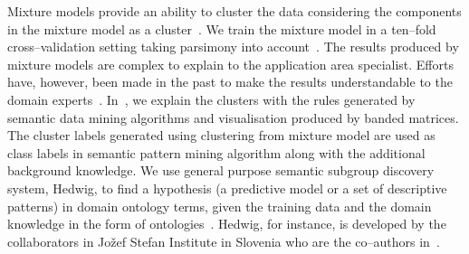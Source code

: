 Mixture models provide an ability to cluster the data
considering the components in the mixture model as 
a cluster~\cite{mclachlan1988mixture,melnykov2010finite}.
We train the mixture model in a ten--fold cross--validation 
setting taking parsimony into account~\cite{tikka2007b}. 
The results produced by
mixture models are complex to explain to the application 
area specialist. Efforts have, however, been made in the
past to make the results
understandable to the domain experts~\cite{Hollmen2007a}. 
In~, we explain the clusters with the rules 
generated by semantic data mining algorithms and visualisation 
produced by banded matrices. The cluster labels generated using 
clustering from mixture model  are used as class labels in 
semantic pattern mining algorithm along with the additional 
background knowledge. We use general purpose semantic 
subgroup discovery system, Hedwig, to find a hypothesis 
(a predictive model or a set of descriptive patterns) 
in domain ontology terms, given the training data and 
the domain knowledge in the form of 
ontologies~\cite{Vavpetic13jiis}. Hedwig, for instance,
is  developed by the collaborators 
in Jo\v{z}ef Stefan Institute in Slovenia who
are the co--authors in~.

